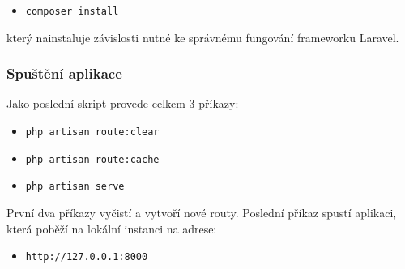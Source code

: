 \begin{itemize}
	\item \verb|composer install|
\end{itemize}

který nainstaluje závislosti nutné ke správnému fungování frameworku Laravel.

\subsubsection{Spuštění aplikace}
Jako poslední skript provede celkem 3 příkazy:
\begin{itemize}
	\item \verb|php artisan route:clear|
	\item \verb|php artisan route:cache|
	\item \verb|php artisan serve|
\end{itemize}

První dva příkazy vyčistí a vytvoří nové routy. Poslední příkaz spustí aplikaci, která poběží na lokální instanci na adrese:

\begin{itemize}
	\item \verb|http://127.0.0.1:8000|
\end{itemize}

